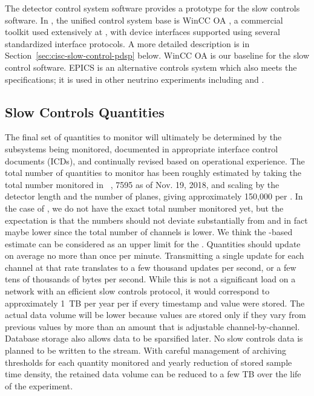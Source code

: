 The  detector control system software \cite{pdspdcs_proc}
provides a prototype for %
the  slow controls software.
In , the unified control system base is WinCC OA \cite{winccoa}, a
commercial toolkit used extensively at , with device interfaces
supported using several standardized interface protocols. A more detailed description is in Section~\ref{sec:cisc-slow-control-pdsp} below.
WinCC OA is our baseline for the  slow control software.
EPICS \cite{epics7} is an alternative controls system which also meets the specifications; it is used in other neutrino experiments including \cite{microboone} and \cite{Lukhanin:2012fp}. 


\subsection{Slow Controls Quantities}
\label{sec:fdgen-slow-cryo-quant}


The final set of quantities to monitor will ultimately be determined
by the subsystems being monitored, documented in appropriate  interface control documents (ICDs), and continually revised based on operational experience.  The total number of quantities to monitor has been roughly estimated by taking the total number monitored in ~\cite{pdspdcs_proc}, 7595 as of Nov. 19, 2018, and scaling by the detector length and the number of planes, giving approximately 150,000 per . In the case of , we do not have the exact total number monitored yet, but the expectation is that the  numbers should not deviate substantially from  and in fact maybe lower since the total number of channels is lower. We think the -based estimate can be considered as an upper limit for the .
Quantities should update on average no more than once per minute.
Transmitting a single update for each channel at that rate translates to a few thousand updates per second, or a few tens of thousands of bytes per second. While this is not a significant load on a network with an efficient slow controls protocol, it would correspond to approximately \SI{1}{TB} per year per  if every timestamp and value were stored.
The actual data volume will be lower because values are stored only if they vary from previous values by more than an amount that is adjustable channel-by-channel.
Database storage also allows data to be sparsified later.
No slow controls data is planned to be written to the  stream.
With careful management of archiving thresholds for each quantity monitored and yearly reduction of stored sample time density, the retained data volume can be reduced to a few TB over the life of the experiment.

